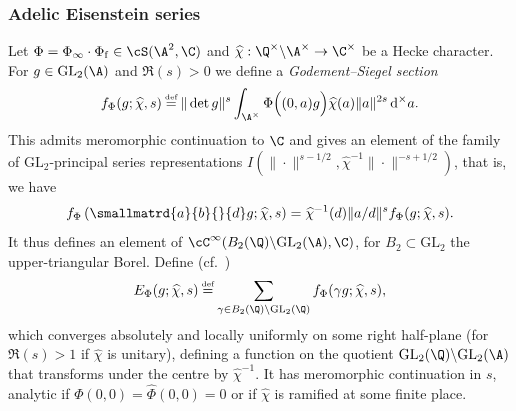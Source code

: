 \documentclass[10pt,reqno,a4paper]{amsart}
\newcommand{\Phif}{{\Phi\subf}}
\newcommand{\chihat}{\widehat{\chi}}
\newcommand{\subf}{_{\mathrm{f}}}
\newcommand{\GL}{\mathrm{GL}}
\begin{document}
\subsubsection{Adelic Eisenstein series} \label{sec:Eis-GL2}
Let $\Phi = \Phi_\infty\cdot \Phif \in \cS(\A^2,\C)$ and $\chihat : \Q^\times\backslash \A^\times \to \C^\times$ be a Hecke character. For $g \in \GL_2(\A)$ and $\Re(s) > 0$ we define a \emph{Godement--Siegel section}
\begin{equation}\label{eq:f_Phi}
f_{\Phi}(g; \chihat, s) \defeq \|\det g\|^s \int_{\A^\times} \Phi\Big((0, a)g\Big) \chihat(a) \|a\|^{2s}\, \mathrm{d}^\times a.
\end{equation}
This admits meromorphic continuation to $\C$ and gives an element of the family of $\GL_2$-principal series representations $I(\|\cdot\|^{s-1/2}, \chihat^{-1}\|\cdot\|^{-s+1/2})$, that is, we have \[f_\Phi\left(\smallmatrd{a}{b}{}{d}g; \chihat,s\right) = \chihat^{-1}(d)\|a/d\|^{s}f_\Phi(g;\chihat, s).\]
It thus defines an element of $\cC^\infty(B_2(\Q)\backslash\GL_2(\A),\C)$, for $B_2 \subset \GL_2$ the upper-triangular Borel. Define (cf.~\cite[\S 19]{jacquet72})
\begin{equation}\label{eq:E_Phi}
E_\Phi(g; \chihat, s) \defeq  \sum_{\gamma \in B_2(\Q) \backslash \GL_2(\Q)} f_\Phi(\gamma g; \chihat, s),
\end{equation}
which converges absolutely and locally uniformly on some right half-plane (for $\Re(s) > 1$ if $\chihat$ is unitary), defining a function on the quotient $\GL_2(\Q) \backslash \GL_2(\A)$ that transforms under the centre by $\chihat^{-1}$. It has meromorphic continuation in $s$, analytic if $\Phi(0, 0) = \hat\Phi(0,0) = 0$ or if $\chihat$ is ramified at some finite place.

\end{document}
